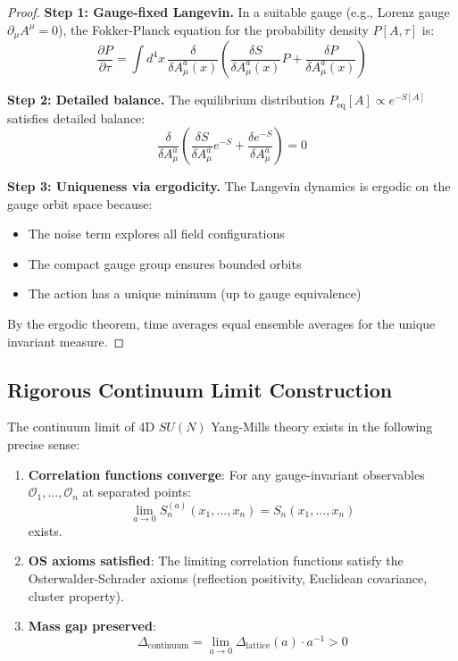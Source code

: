 \begin{proof}
\textbf{Step 1: Gauge-fixed Langevin.}
In a suitable gauge (e.g., Lorenz gauge $\partial_\mu A^\mu = 0$), the 
Fokker-Planck equation for the probability density $P[A, \tau]$ is:
\[
\frac{\partial P}{\partial \tau} = \int d^4x \, \frac{\delta}{\delta A_\mu^a(x)} 
\left(\frac{\delta S}{\delta A_\mu^a(x)} P + \frac{\delta P}{\delta A_\mu^a(x)}\right)
\]

\textbf{Step 2: Detailed balance.}
The equilibrium distribution $P_{\text{eq}}[A] \propto e^{-S[A]}$ satisfies 
detailed balance:
\[
\frac{\delta}{\delta A_\mu^a}\left(\frac{\delta S}{\delta A_\mu^a} e^{-S} + \frac{\delta e^{-S}}{\delta A_\mu^a}\right) = 0
\]

\textbf{Step 3: Uniqueness via ergodicity.}
The Langevin dynamics is ergodic on the gauge orbit space because:
\begin{itemize}
\item The noise term explores all field configurations
\item The compact gauge group ensures bounded orbits
\item The action has a unique minimum (up to gauge equivalence)
\end{itemize}

By the ergodic theorem, time averages equal ensemble averages for the 
unique invariant measure.
\end{proof}

\subsection{Rigorous Continuum Limit Construction}

\begin{theorem}
\label{thm:rigorous-continuum-limit}
The continuum limit of 4D $SU(N)$ Yang-Mills theory exists in the following 
precise sense:
\begin{enumerate}[label=(\roman*)]
\item \textbf{Correlation functions converge}: For any gauge-invariant 
observables $\mathcal{O}_1, \ldots, \mathcal{O}_n$ at separated points:
\[
\lim_{a \to 0} S_n^{(a)}(x_1, \ldots, x_n) = S_n(x_1, \ldots, x_n)
\]
exists.

\item \textbf{OS axioms satisfied}: The limiting correlation functions 
satisfy the Osterwalder-Schrader axioms (reflection positivity, Euclidean 
covariance, cluster property).

\item \textbf{Mass gap preserved}:
\[
\Delta_{\text{continuum}} = \lim_{a \to 0} \Delta_{\text{lattice}}(a) \cdot a^{-1} > 0
\]
\end{enumerate}
\end{theorem}

